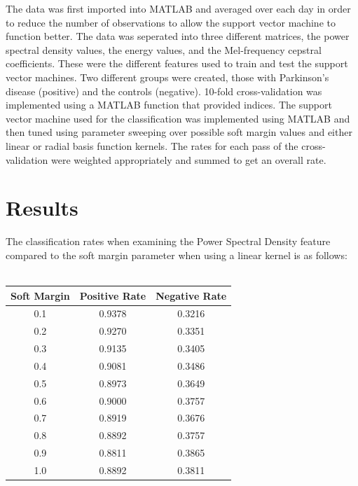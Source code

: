 \documentclass[twoside]{article}
\begin{document}
\begin{multicols}{2}
The data was first imported into MATLAB and averaged over each day in order to reduce the number of observations
to allow the support vector machine to function better. The data was seperated into three
different matrices, the power spectral density values, the energy values, and the Mel-frequency cepstral coefficients.
These were the different features used to train and test the support vector machines.
Two different groups were created, those with Parkinson's disease (positive)
and the controls (negative). 10-fold cross-validation was implemented using a MATLAB function that
provided indices. The support vector machine used for the classification was implemented using MATLAB
and then tuned using parameter sweeping over possible soft margin values and either linear or radial basis function
kernels. The rates for each pass of the cross-validation were weighted appropriately and summed to get
an overall rate.






\section{Results}

The classification rates when examining the Power Spectral Density feature
compared to the soft margin parameter when using a linear kernel is as follows:\\ \\
\begin{tabular}{|c|c|c|}
	\hline
	Soft Margin 	& Positive Rate & Negative Rate \\ \hline
	0.1		& 0.9378	& 0.3216 \\ \hline
	0.2		& 0.9270	& 0.3351 \\ \hline
	0.3		& 0.9135	& 0.3405 \\ \hline
	0.4		& 0.9081	& 0.3486\\ \hline
	0.5		& 0.8973	& 0.3649\\ \hline
	0.6		& 0.9000	& 0.3757\\ \hline
	0.7		& 0.8919	& 0.3676\\ \hline
	0.8		& 0.8892	& 0.3757\\ \hline
	0.9		& 0.8811	& 0.3865\\ \hline
	1.0		& 0.8892	& 0.3811 \\ \hline
\end{tabular}


\end{multicols}
\end{document}
